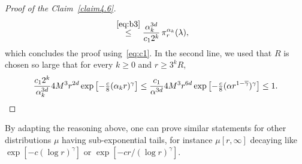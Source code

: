 \documentclass[AHL,Unicode,longabstracts]{cedram}
\begin{document}
\begin{proof}[{Proof of the Claim~\ref{claim4.6}}]
\begin{align*}
&\stackrel{\eqref{eq:b3}}\le \frac{\alpha_k^{3d}}{c_12^k}\,\pi_r^{\alpha_k}(\lambda),
\end{align*}
which concludes the proof using~\eqref{eq:c1}. In the second line, we used that $R$ is chosen so large that for every $k\ge0$ and $r\ge 3^k R$,
\begin{equation}\label{eq:b3}
\frac {c_1 2^k}{\alpha_k^{3d}} 4 M^3 r^{2d} \exp \left[-\tfrac c8(\alpha_kr)^\gamma\right] \leq \frac {c_1}{\alpha^{3d}} 4 M^3 r^{6d} \exp \left[-\tfrac c8 (\alpha r^{1-\overline\gamma})^\gamma\right] \leq 1.\qedhere
\end{equation}
\end{proof}\let\qed\relax


\begin{rema}
By adapting the reasoning above, one can prove similar statements for other distributions $\mu$ having sub-exponential tails, for instance $\mu[r,\infty]$ decaying like $\exp[-c(\log r)^\gamma]$ or $\exp[-cr/(\log r)^\gamma]$.
\end{rema}



\end{document}
